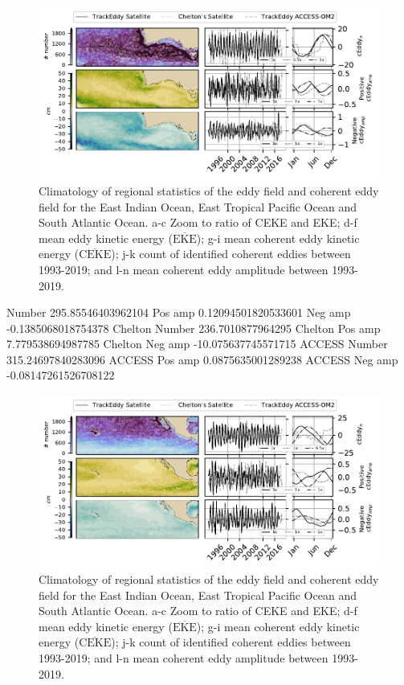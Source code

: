 \documentclass[draft]{agujournal2019}
\newcommand{\MEKE}{\overline{\textrm{EKE}}}
\newcommand{\MCEKE}{\overline{\textrm{CEKE}}}
\begin{document}
	\begin{figure}
	    \centering
	    \includegraphics[width=1\textwidth]{figures/regional_eke_ceke_stats_0.pdf}
	    \caption{Climatology of regional statistics of the eddy field and coherent eddy field for the East Indian Ocean, East Tropical Pacific Ocean and South Atlantic Ocean. a-c Zoom to ratio of CEKE and EKE; d-f  mean eddy kinetic energy ($\MEKE$); g-i mean coherent eddy kinetic energy ($\MCEKE$); j-k count of identified coherent eddies between 1993-2019; and l-n mean coherent eddy amplitude between 1993-2019.}
	    \label{fig:my_label}
	\end{figure}

	Number 295.85546403962104
	Pos amp 0.12094501820533601
	Neg amp -0.1385068018754378
	Chelton Number 236.7010877964295
	Chelton Pos amp 7.779538694987785
	Chelton Neg amp -10.075637745571715
	ACCESS Number 315.24697840283096
	ACCESS Pos amp 0.0875635001289238
	ACCESS Neg amp -0.08147261526708122

	\begin{figure}
	    \centering
	    \includegraphics[width=1\textwidth]{figures/regional_eke_ceke_stats_1.pdf}
	    \caption{Climatology of regional statistics of the eddy field and coherent eddy field for the East Indian Ocean, East Tropical Pacific Ocean and South Atlantic Ocean. a-c Zoom to ratio of CEKE and EKE; d-f  mean eddy kinetic energy ($\MEKE$); g-i mean coherent eddy kinetic energy ($\MCEKE$); j-k count of identified coherent eddies between 1993-2019; and l-n mean coherent eddy amplitude between 1993-2019.}
	    \label{fig:my_label}
	\end{figure}
\end{document}
